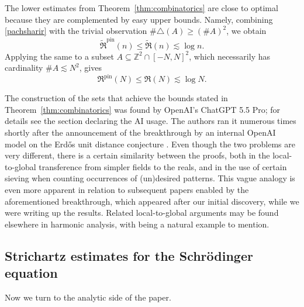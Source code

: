 \documentclass[11pt,reqno]{amsart}
\numberwithin{equation}{section}
\renewcommand{\leq}{\leqslant}
\renewcommand{\geq}{\geqslant}
\begin{document}
The lower estimates from Theorem~\ref{thm:combinatorics} are close to optimal because they are complemented by easy upper bounds. Namely, combining \eqref{pachsharir} with the trivial observation $\#\triangle(A)\geq(\#A)^2$, we obtain
\[ \widetilde{\mathfrak{R}}^{\mathrm{pin}}(n) \leq \widetilde{\mathfrak{R}}(n) \lesssim \log n. \]
Applying the same to a subset $A\subseteq\mathbb{Z}^2\cap[-N,N]^2$, which necessarily has cardinality $\#A\lesssim N^2$, gives
\[ \mathfrak{R}^{\mathrm{pin}}(N) \leq \mathfrak{R}(N) \lesssim \log N. \]

The construction of the sets that achieve the bounds stated in Theorem~\ref{thm:combinatorics} was found by OpenAI's ChatGPT 5.5 Pro; for details see the section declaring the AI usage. The authors ran it numerous times shortly after the announcement of the breakthrough by an internal OpenAI model on the Erd\H{o}s unit distance conjecture \cite{OpenAIErdos,UnitErdos}. Even though the two problems are very different, there is a certain similarity between the proofs, both in the local-to-global transference from simpler fields to the reals, and in the use of certain sieving when counting occurrences of (un)desired patterns. This vague analogy is even more apparent in relation to subsequent papers \cite{SumProduct,SplitPrimes,CMPSY} enabled by the aforementioned breakthrough, which appeared after our initial discovery, while we were writing up the results. Related local-to-global arguments may be found elsewhere in harmonic analysis, with \cite{HW18} being a natural example to mention.

\subsection{Strichartz estimates for the Schr\"{o}dinger equation}
Now we turn to the analytic side of the paper.
\end{document}
